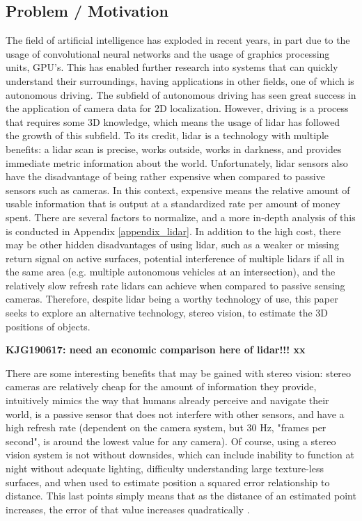 \subsection{Problem / Motivation}
The field of artificial intelligence has exploded in recent years, in part due to the usage of convolutional neural networks and the usage of graphics processing units, GPU's. This has enabled further research into systems that can quickly understand their surroundings, having applications in other fields, one of which is autonomous driving. The subfield of autonomous driving has seen great success in the application of camera data for 2D localization. However, driving is a process that requires some 3D knowledge, which means the usage of lidar has followed the growth of this subfield. To its credit, lidar is a technology with multiple benefits: a lidar scan is precise, works outside, works in darkness, and provides immediate metric information about the world. Unfortunately, lidar sensors also have the disadvantage of being rather expensive when compared to passive sensors such as cameras. In this context, expensive means the relative amount of usable information that is output at a standardized rate per amount of money spent. There are several factors to normalize, and a more in-depth analysis of this is conducted in Appendix \ref{appendix_lidar}. In addition to the high cost, there may be other hidden disadvantages of using lidar, such as a weaker or missing return signal on active surfaces, potential interference of multiple lidars if all in the same area (e.g. multiple autonomous vehicles at an intersection), and the relatively slow refresh rate lidars can achieve when compared to passive sensing cameras. Therefore, despite lidar being a worthy technology of use, this paper seeks to explore an alternative technology, stereo vision, to estimate the 3D positions of objects.

\textbf{KJG190617: need an economic comparison here of lidar!!! xx}

There are some interesting benefits that may be gained with stereo vision: stereo cameras are relatively cheap for the amount of information they provide, intuitively mimics the way that humans already perceive and navigate their world, is a passive sensor that does not interfere with other sensors, and have a high refresh rate (dependent on the camera system, but 30 Hz, "frames per second", is around the lowest value for any camera). Of course, using a stereo vision system is not without downsides, which can include inability to function at night without adequate lighting, difficulty understanding large texture-less surfaces, and when used to estimate position a squared error relationship to distance. This last points simply means that as the distance of an estimated point increases, the error of that value increases quadratically \cite{wang_pseudo-lidar_2019}.

